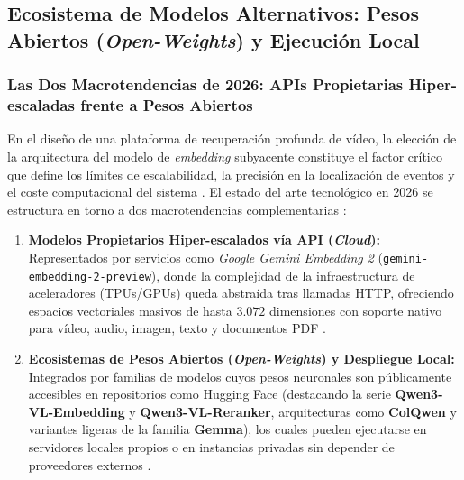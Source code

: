 
\subsection{Ecosistema de Modelos Alternativos: Pesos Abiertos (\textit{Open-Weights}) y Ejecución Local}
\label{subsec:modelos_locales}

\subsubsection{Las Dos Macrotendencias de 2026: APIs Propietarias Hiper-escaladas frente a Pesos Abiertos}
\label{subsubsec:macrotendencias_2026}

En el diseño de una plataforma de recuperación profunda de vídeo, la elección de la arquitectura del modelo de \textit{embedding} subyacente constituye el factor crítico que define los límites de escalabilidad, la precisión en la localización de eventos y el coste computacional del sistema \cite{gemini_emb2_docs}. %
El estado del arte tecnológico en 2026 se estructura en torno a dos macrotendencias complementarias \cite{qwen3_vl_emb2026, gemini_emb2_docs}: %
\begin{enumerate}
    \item \textbf{Modelos Propietarios Hiper-escalados vía API (\textit{Cloud}):} Representados por servicios como \textit{Google Gemini Embedding 2} (\texttt{gemini-embedding-2-preview}), donde la complejidad de la infraestructura de aceleradores (TPUs/GPUs) queda abstraída tras llamadas HTTP, ofreciendo espacios vectoriales masivos de hasta $3.072$ dimensiones con soporte nativo para vídeo, audio, imagen, texto y documentos PDF \cite{gemini_emb2_docs, openrouter_gemini_emb2}. %
    \item \textbf{Ecosistemas de Pesos Abiertos (\textit{Open-Weights}) y Despliegue Local:} Integrados por familias de modelos cuyos pesos neuronales son públicamente accesibles en repositorios como Hugging Face (destacando la serie \textbf{Qwen3-VL-Embedding} y \textbf{Qwen3-VL-Reranker}, arquitecturas como \textbf{ColQwen} y variantes ligeras de la familia \textbf{Gemma}), los cuales pueden ejecutarse en servidores locales propios o en instancias privadas sin depender de proveedores externos \cite{qwen3_vl_emb2026, hf_train_multimodal2026, prajwal2025multimodal}. %
\end{enumerate}

